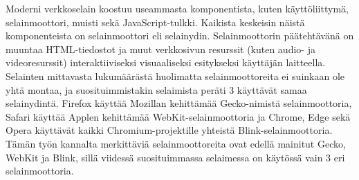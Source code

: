 \documentclass[finnish, 12pt, a4paper, elec, utf8, a-1b, online]{aaltothesis}
\begin{document}
\begin{table}[htb]
  \caption{Verkkoselainten markkinaosuus tietokonekäytössä helmikuussa 2022 StatCounterin mukaan. \cite{StatCounter} \label{taulukko1}}
  \centering
\end{table}

\noindent Moderni verkkoselain koostuu useammasta komponentista, kuten käyttöliittymä, selainmoottori, muisti sekä JavaScript-tulkki. Kaikista keskeisin näistä komponenteista on selainmoottori eli selainydin. Selainmoottorin päätehtävänä on muuntaa HTML-tiedostot ja muut verkkosivun resurssit (kuten audio- ja videoresurssit) interaktiiviseksi visuaaliseksi esitykseksi käyttäjän laitteella. \\

\noindent Selainten mittavasta lukumäärästä huolimatta selainmoottoreita ei suinkaan ole yhtä montaa, ja suosituimmistakin selaimista peräti 3 käyttävät samaa selainydintä. Firefox käyttää Mozillan kehittämää Gecko-nimistä selainmoottoria, Safari käyttää Applen kehittämää WebKit-selainmoottoria ja Chrome, Edge sekä Opera käyttävät kaikki Chromium-projektille yhteistä Blink-selainmoottoria. \cite{Nield} Tämän työn kannalta merkittäviä selainmoottoreita ovat edellä mainitut Gecko, WebKit ja Blink, sillä viidessä suosituimmassa selaimessa on käytössä vain 3 eri selainmoottoria.
\end{document}
